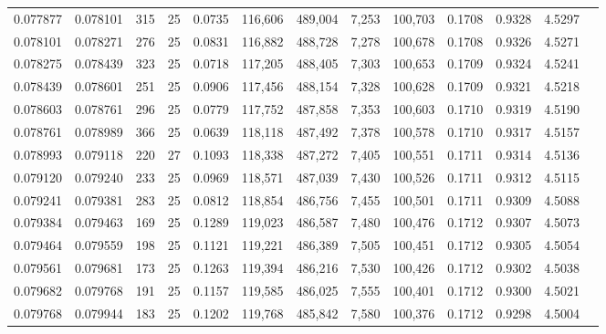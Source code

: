 \begin{tabular}{rrrrrrrrrrrrr}
0.077877 & 0.078101 & 315 &  25 &                                     0.0735 & 116,606 & 489,004 &   7,253 & 100,703 & 0.1708 & 0.9328 & 4.5297 \\
0.078101 & 0.078271 & 276 &  25 &                                     0.0831 & 116,882 & 488,728 &   7,278 & 100,678 & 0.1708 & 0.9326 & 4.5271 \\
0.078275 & 0.078439 & 323 &  25 &                                     0.0718 & 117,205 & 488,405 &   7,303 & 100,653 & 0.1709 & 0.9324 & 4.5241 \\
0.078439 & 0.078601 & 251 &  25 &                                     0.0906 & 117,456 & 488,154 &   7,328 & 100,628 & 0.1709 & 0.9321 & 4.5218 \\
0.078603 & 0.078761 & 296 &  25 &                                     0.0779 & 117,752 & 487,858 &   7,353 & 100,603 & 0.1710 & 0.9319 & 4.5190 \\
0.078761 & 0.078989 & 366 &  25 &                                     0.0639 & 118,118 & 487,492 &   7,378 & 100,578 & 0.1710 & 0.9317 & 4.5157 \\
0.078993 & 0.079118 & 220 &  27 &                                     0.1093 & 118,338 & 487,272 &   7,405 & 100,551 & 0.1711 & 0.9314 & 4.5136 \\
0.079120 & 0.079240 & 233 &  25 &                                     0.0969 & 118,571 & 487,039 &   7,430 & 100,526 & 0.1711 & 0.9312 & 4.5115 \\
0.079241 & 0.079381 & 283 &  25 &                                     0.0812 & 118,854 & 486,756 &   7,455 & 100,501 & 0.1711 & 0.9309 & 4.5088 \\
0.079384 & 0.079463 & 169 &  25 &                                     0.1289 & 119,023 & 486,587 &   7,480 & 100,476 & 0.1712 & 0.9307 & 4.5073 \\
0.079464 & 0.079559 & 198 &  25 &                                     0.1121 & 119,221 & 486,389 &   7,505 & 100,451 & 0.1712 & 0.9305 & 4.5054 \\
0.079561 & 0.079681 & 173 &  25 &                                     0.1263 & 119,394 & 486,216 &   7,530 & 100,426 & 0.1712 & 0.9302 & 4.5038 \\
0.079682 & 0.079768 & 191 &  25 &                                     0.1157 & 119,585 & 486,025 &   7,555 & 100,401 & 0.1712 & 0.9300 & 4.5021 \\
0.079768 & 0.079944 & 183 &  25 &                                     0.1202 & 119,768 & 485,842 &   7,580 & 100,376 & 0.1712 & 0.9298 & 4.5004 \\

\end{tabular}
